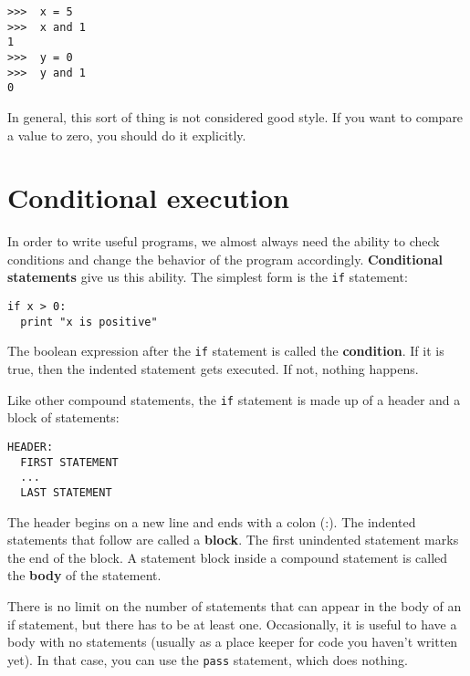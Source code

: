 \beforeverb
\begin{verbatim}
>>>  x = 5
>>>  x and 1
1
>>>  y = 0
>>>  y and 1
0
\end{verbatim}
\afterverb
%
In general, this sort of thing is not considered good style.  If you
want to compare a value to zero, you should do it explicitly.


\section{Conditional execution}
\label{conditional execution}

In order to write useful programs, we almost always need the ability
to check conditions and change the behavior of the program
accordingly.  {\bf Conditional statements} give us this ability.  The
simplest form is the {\tt if} statement:

\beforeverb
\begin{verbatim}
if x > 0:
  print "x is positive"
\end{verbatim}
\afterverb
%
The boolean expression after the {\tt if} statement is
called the {\bf condition}.  If it is true, then the indented
statement gets executed.  If not, nothing happens.


Like other compound statements, the
{\tt if} statement is made up of a header and a block
of statements:

\beforeverb
\begin{verbatim}
HEADER:
  FIRST STATEMENT
  ...
  LAST STATEMENT
\end{verbatim}
\afterverb
%
The header begins on a new line and ends with a colon (:).  The
indented statements that follow are called a {\bf block}.
The first unindented statement marks the end of the block.
A statement block inside a compound statement is called the {\bf body}
of the statement.


There is no limit on the number of statements that can appear in
the body of an if statement, but there has to be at least one.
Occasionally, it is useful to have a body with no statements (usually
as a place keeper for code you haven't written yet).  In that
case, you can use the {\tt pass} statement, which does nothing.

